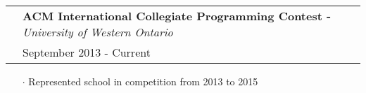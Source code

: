 \documentclass[letterpaper, oneside, final]{scrartcl} %
\newcommand{\gray}{\rowcolor[gray]{.90}} %
\begin{document}
\begin{center}
\vspace{-0.05cm}

\begin{tabularx}{0.97\linewidth}{>{\raggedleft\scshape}p{0cm}X}
\gray & \textbf{ACM International Collegiate Programming Contest -} \textit{University of Western Ontario}\\
\gray & {September 2013 - Current}\	\
\end{tabularx}
\vspace{-0.1cm}
\begin{itemize} \itemsep-0.2cm
\item[$\cdot$] Represented school in competition from 2013 to 2015 \\

\end{itemize}


\end{center}
\end{document}
